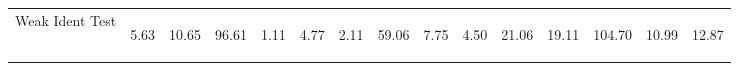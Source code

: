 \begin{center}
\begin{tabular}{lcccccccccccccc}
Weak Ident Test  & \begin{normalsize}5.63\end{normalsize} & \begin{normalsize}10.65\end{normalsize} & \begin{normalsize}96.61\end{normalsize} & \begin{normalsize}1.11\end{normalsize} & \begin{normalsize}4.77\end{normalsize} & \begin{normalsize}2.11\end{normalsize} & \begin{normalsize}59.06\end{normalsize} & \begin{normalsize}7.75\end{normalsize} & \begin{normalsize}4.50\end{normalsize} & \begin{normalsize}21.06\end{normalsize} & \begin{normalsize}19.11\end{normalsize} & \begin{normalsize}104.70\end{normalsize} & \begin{normalsize}10.99\end{normalsize} & \begin{normalsize}12.87\end{normalsize}\\

\end{tabular}
\end{center}
